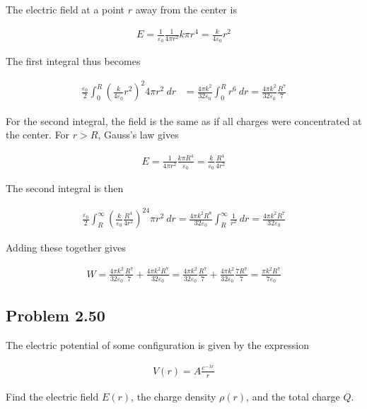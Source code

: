 \documentclass{article}
\begin{document}
The electric field at a point $r$ away from the center is 

\begin{align*}
    E = \frac{1}{\varepsilon_0}\frac{1}{4\pi r^2}k\pi r^4 = \frac{k}{4\varepsilon_0}r^2
\end{align*}

The first integral thus becomes 

\begin{align*}
    \frac{\varepsilon_0}{2} \int_0^R \left( \frac{k}{4\varepsilon_0}r^2 \right)^2 4\pi r^2\ dr &= \frac{4\pi k^2}{32\varepsilon_0}\int_0^R r^6\ dr = \frac{4\pi k^2}{32\varepsilon_0}\frac{R^7}{7}
\end{align*}

For the second integral, the field is the same as if all charges were concentrated at the center. For $r > R$, Gauss's law gives

\begin{align*}
    E = \frac{1}{4\pi r^2}\frac{k\pi R^4}{\varepsilon_0} = \frac{k}{\varepsilon_0}\frac{R^4}{4r^2}
\end{align*}


The second integral is then 

\begin{align*}
    \frac{\varepsilon_0}{2}\int_R^{\infty} \left(  \frac{k}{\varepsilon_0}\frac{R^4}{4r^2} \right)^24\pi r^2\ dr = \frac{4\pi k^2R^8}{32\varepsilon_0}\int_R^{\infty}\frac{1}{r^2}\ dr = \frac{4\pi k^2R^7}{32\varepsilon_0}
\end{align*}

Adding these together gives 

\begin{align*}
    W = \frac{4\pi k^2}{32\varepsilon_0}\frac{R^7}{7} + \frac{4\pi k^2R^7}{32\varepsilon_0} = \frac{4\pi k^2}{32\varepsilon_0}\frac{R^7}{7} + \frac{4\pi k^2}{32\varepsilon_0}\frac{7R^7}{7} = \frac{\pi k^2R^7}{7\varepsilon_0}
\end{align*}

\newpage

\subsection*{Problem 2.50} 
The electric potential of some configuration is given by the expression

\begin{align*}
    V(r) = A\frac{e^{-\lambda r}}{r}
\end{align*}

Find the electric field $E(r)$, the charge density $\rho(r)$, and the total charge $Q$.
\end{document}

